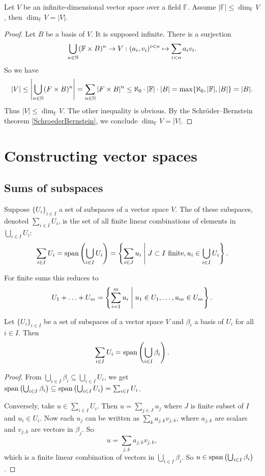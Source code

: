 \begin{lemma}
Let $V$ be an infinite-dimensional vector space over a field $\mathbb{F}$. Assume $|\mathbb{F}|\leq \dim_{\mathbb{F}} V$, then $\dim_{\mathbb{F}} V = |V|$. \label{vsCardinality}
\end{lemma}
\begin{proof}
Let $B$ be a basis of $V$. It is supposed infinite. There is a surjection
\[\bigcup_{n\in\mathbb{N}}(\mathbb{F}\times B)^{n} \to V: (a_i,v_i)^{i<n} \mapsto \sum_{i<n}a_iv_i. \]
So we have
\[ |V| \leq \left|\bigcup_{n\in\mathbb{N}}(F\times B)^{n}\right| = \sum_{n\in \mathbb{N}}|F\times B|^n \leq \aleph_0\cdot |\mathbb{F}| \cdot |B| = \max\{\aleph_0, |\mathbb{F}|, |B|\} = |B|. \]
Thus $|V|\leq \dim_{\mathbb{F}} V$. The other inequality is obvious. By the Schröder–Bernstein theorem \ref{SchroederBernstein}, we conclude $\dim_{\mathbb{F}} V = |V|$.
\end{proof}

\section{Constructing vector spaces}
\subsection{Sums of subspaces}
\begin{definition}
Suppose $\{U_i\}_{i\in I}$ a set of subspaces of a vector space $V$. The  of these subspaces, denoted $\sum_{i\in I}U_i$, is the set of all finite linear combinations of elements in $\bigcup_{i\in I}U_i$:
\[ \sum_{i\in I}U_i = \operatorname{span}\left(\bigcup_{i\in I} U_i\right) = \left\{ \sum_{i\in J} u_i \;\middle|\; \text{$J\subset I$ finite}, u_i\in \bigcup_{i\in I}U_i \right\}. \]
\end{definition}
For finite sums this reduces to
\[ U_1+\ldots + U_m = \left\{ \sum_{i=1}^m u_i \;\middle|\; u_1\in U_1, \ldots, u_m\in U_m \right\}. \]

\begin{proposition} \label{basisSum}
Let $\{U_i\}_{i\in I}$ be a set of subspaces of a vector space $V$ and $\beta_i$ a basis of $U_i$ for all $i\in I$. Then
\[ \sum_{i\in I}U_i = \operatorname{span}\left(\bigcup_{i\in I}\beta_i\right). \]
\end{proposition}
\begin{proof}
From $\bigcup_{i\in I}\beta_i \subseteq \bigcup_{i\in I} U_i$, we get $\operatorname{span}\left(\bigcup_{i\in I}\beta_i\right) \subseteq \operatorname{span}\left(\bigcup_{i\in I} U_i\right) = \sum_{i\in I}U_i$.

Conversely, take $u\in \sum_{i\in I}U_i$. Then $u = \sum_{j\in J}u_j$ where $J$ is finite subset of $I$ and $u_i\in U_i$. Now each $u_j$ can be written as $\sum_k a_{j,k}v_{j,k}$, where $a_{j,k}$ are scalars and $v_{j,k}$ are vectors in $\beta_j$. So
\[ u = \sum_{j,k}a_{j,k}v_{j,k}, \]
which is a finite linear combination of vectors in $\bigcup_{i\in I}\beta_i$. So $u\in \operatorname{span}\left(\bigcup_{i\in I}\beta_i\right)$.
\end{proof}

